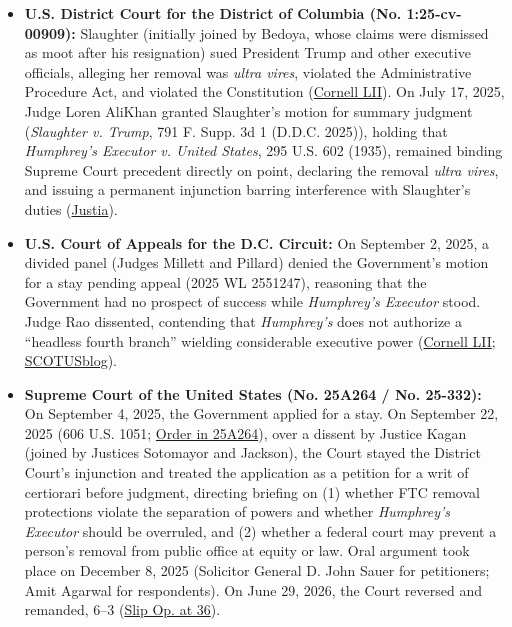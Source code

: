 \documentclass[12pt]{article}
\begin{document}
\begin{itemize}
    \item \textbf{U.S. District Court for the District of Columbia (No. 1:25-cv-00909):} Slaughter (initially joined by Bedoya, whose claims were dismissed as moot after his resignation) sued President Trump and other executive officials, alleging her removal was \textit{ultra vires}, violated the Administrative Procedure Act, and violated the Constitution (\href{https://www.law.cornell.edu/supremecourt/text/25-332}{Cornell LII}). On July 17, 2025, Judge Loren AliKhan granted Slaughter's motion for summary judgment (\textit{Slaughter v. Trump}, 791 F. Supp. 3d 1 (D.D.C. 2025)), holding that \textit{Humphrey's Executor v. United States}, 295 U.S. 602 (1935), remained binding Supreme Court precedent directly on point, declaring the removal \textit{ultra vires}, and issuing a permanent injunction barring interference with Slaughter's duties (\href{https://supreme.justia.com/cases/federal/us/609/25-332/}{Justia}).
    \item \textbf{U.S. Court of Appeals for the D.C. Circuit:} On September 2, 2025, a divided panel (Judges Millett and Pillard) denied the Government's motion for a stay pending appeal (2025 WL 2551247), reasoning that the Government had no prospect of success while \textit{Humphrey's Executor} stood. Judge Rao dissented, contending that \textit{Humphrey's} does not authorize a ``headless fourth branch'' wielding considerable executive power (\href{https://www.law.cornell.edu/supremecourt/text/25-332}{Cornell LII}; \href{https://www.scotusblog.com/2026/06/court-allows-trump-to-fire-ftc-commissioner-and-overturns-major-restraint-on-presidential-power/}{SCOTUSblog}).
    \item \textbf{Supreme Court of the United States (No. 25A264 / No. 25-332):} On September 4, 2025, the Government applied for a stay. On September 22, 2025 (606 U.S. 1051; \href{https://www.supremecourt.gov/opinions/24pdf/25a264_o759.pdf}{Order in 25A264}), over a dissent by Justice Kagan (joined by Justices Sotomayor and Jackson), the Court stayed the District Court's injunction and treated the application as a petition for a writ of certiorari before judgment, directing briefing on (1) whether FTC removal protections violate the separation of powers and whether \textit{Humphrey's Executor} should be overruled, and (2) whether a federal court may prevent a person's removal from public office at equity or law. Oral argument took place on December 8, 2025 (Solicitor General D. John Sauer for petitioners; Amit Agarwal for respondents). On June 29, 2026, the Court reversed and remanded, 6--3 (\href{https://www.supremecourt.gov/opinions/25pdf/25-322_new_4gcj.pdf}{Slip Op. at 36}).
\end{itemize}
\end{document}
